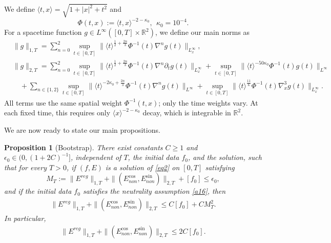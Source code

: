 \documentclass[reqno,11pt]{amsart}
\numberwithin{equation}{section}
\def\R{{\mathbb R}}
\def\R{{\bf R}}
\def\R{\mathbb{R}}
\newtheorem{proposition}[theorem]{Proposition}
\begin{document}
	We define $\langle t,x\rangle=\sqrt{1+|x|^2+t^2}$ and
	\begin{equation}\label{cbc1}
		\Phi(t,x):=\langle t,x\rangle^{-2-\kappa_0},~~\kappa_0=10^{-4}.
	\end{equation}
	For a spacetime function $g\in L^\infty([0,T]\times\R^2)$, we define our main norms as
	\begin{equation}\label{cbc2}
		\begin{split}
		&	\|g\|_{1,T}=\sum_{n=0}^{2}\sup_{t\in [0,T]}\big\| \langle t\rangle^{\frac{1}{2}+\frac{2n}{3}} \Phi^{-1}(t)\nabla^n g(t)\big\|_{L^{\infty}_x},\\
			&	\|g\|_{2,T}=\sum_{n=0}^{2}\sup_{t\in [0,T]}\|\langle t\rangle^{\frac{1}{2}+\frac{2n}{3}}	\Phi^{-1}(t)\nabla^n \partial_tg(t)\|_{L^{\infty}_x}+\sup_{t\in [0,T]}\|\langle t\rangle^{-50\kappa_0}\Phi^{-1}(t)g(t)\|_{L^{\infty}}\\&\quad+\sum_{n\in\{1,2\}}\sup_{t\in [0,T]}\|\langle t\rangle^{-2\kappa_0+\frac{2n}{3}}\Phi^{-1}(t)\nabla^ng(t)\|_{L^{\infty}}+\sup_{t\in[0,T]}
			\|\langle t\rangle^{\frac{11}{6}}\Phi^{-1}(t)\nabla_x^3g(t)\|_{L_x^{\infty}}.
		\end{split}
	\end{equation}
	All terms use the same spatial weight $\Phi^{-1}(t,x)$; only the time
	weights vary. At each fixed time, this requires only
	$\langle x\rangle^{-2-\kappa_0}$ decay, which is integrable in $\mathbb R^2$.
	
	We are now ready to state our main propositions.
	
	
	\begin{proposition}[Bootstrap]\label{propoglobal3d}
		There exist constants $C\geq1$ and
		$\epsilon_0\in(0,(1+2C)^{-1}]$, independent of $T$, the initial
		data $f_0$, and the solution, such that for every $T>0$,
		if $(f,E)$ is a solution of \eqref{eq2} on $[0,T]$ satisfying
		\begin{equation}\label{bo1}
			M_T := \|E^{reg}\|_{1,T} + \|(E^{\cos}_{non},E^{\sin}_{non})\|_{2,T} + [f_0] \le \epsilon_0,
		\end{equation}
		and if the initial data $f_0$ satisfies the neutrality assumption \eqref{a16}, then
		\begin{align}\label{B}
			\|E^{reg}\|_{1,T} + \|(E^{\cos}_{non},E^{\sin}_{non})\|_{2,T}
			\leq C [f_0] + CM_T^2.
		\end{align}
		In particular,
		\begin{align}\label{B'}
			\|E^{reg}\|_{1,T} + \|(E^{\cos}_{non},E^{\sin}_{non})\|_{2,T}
			\leq 2C [f_0].
		\end{align}
	\end{proposition}
	
\end{document}
